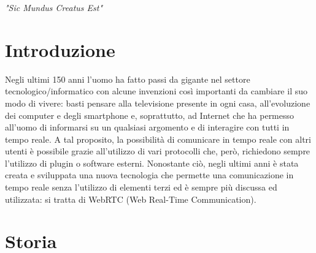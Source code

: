 \documentclass[11pt, a4paper, openany]{book}
\newenvironment{abstract}{}{}
\newcommand\blankpage{%
	\null
	\thispagestyle{empty}%
	\addtocounter{page}{-1}%
	\newpage}
\begin{document}
	\afterpage{\blankpage}
	
	\begin{flushright}
		\thispagestyle{empty} 
		\vspace*{100mm}
		\Large \emph{"Sic Mundus Creatus Est"}
	\end{flushright}
	
	\afterpage{\blankpage}
	
	\tableofcontents 

	\afterpage{\blankpage}
	

	\afterpage{\blankpage}
	\chapter{Introduzione}
	
	Negli ultimi 150 anni l'uomo ha fatto passi da gigante nel settore tecnologico/informatico con alcune invenzioni così importanti da cambiare il suo modo di vivere: basti pensare alla televisione presente in ogni casa, all'evoluzione dei computer e degli smartphone e, soprattutto, ad Internet che ha permesso all'uomo di informarsi su un qualsiasi argomento e di interagire con tutti in tempo reale. A tal proposito, la possibilità di comunicare in tempo reale con altri utenti è possibile grazie all'utilizzo di vari protocolli che, però, richiedono sempre l'utilizzo di plugin o software esterni. Nonostante ciò, negli ultimi anni è stata creata e sviluppata una nuova tecnologia che permette una comunicazione in tempo reale senza l'utilizzo di elementi terzi ed è sempre più discussa ed utilizzata: si tratta di WebRTC (Web Real-Time Communication).

 	\afterpage{\blankpage}
 	\chapter{Storia}
\end{document}
